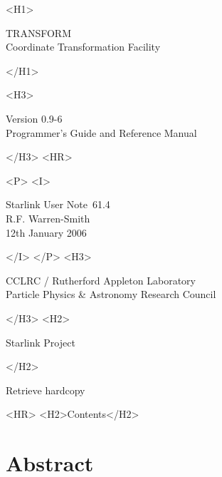 \documentclass[twoside,11pt]{article}
\newcommand{\stardoccategory}  {Starlink User Note}
\newcommand{\stardocsource}    {sun\stardocnumber}
\newcommand{\stardocnumber}    {61.4}
\newcommand{\stardocauthors}   {R.F. Warren-Smith}
\newcommand{\stardocdate}      {12th January 2006}
\newcommand{\stardoctitle}     {TRANSFORM \latexhtml{\\[2.5ex]}{\\}
                                Coordinate Transformation Facility}
\newcommand{\stardocversion}   {Version 0.9-6}
\newcommand{\stardocmanual}    {Programmer's Guide and Reference Manual}
\newcommand{\htmladdnormallink}[2]{#1}
\newcommand{\htmladdimg}[1]{}
\newcommand{\htmlref}[2]{#1}
\newcommand{\htmladdtonavigation}[1]{}
\newcommand{\latexhtml}[2]{#1}
\newcommand{\xlabel}[1]{}
\renewcommand{\_}{\texttt{\symbol{95}}}
\begin{document}
\begin{htmlonly}
   \xlabel{}
   \begin{rawhtml} <H1> \end{rawhtml}
      \stardoctitle
   \begin{rawhtml} </H1> \end{rawhtml}
   \begin{rawhtml} <H3> \end{rawhtml}
      \stardocversion \\
      \stardocmanual
   \begin{rawhtml} </H3> <HR> \end{rawhtml}


   \begin{rawhtml} <P> <I> \end{rawhtml}
   \stardoccategory\ \stardocnumber \\
   \stardocauthors \\
   \stardocdate
   \begin{rawhtml} </I> </P> <H3> \end{rawhtml}
      \htmladdnormallink{CCLRC / Rutherford Appleton Laboratory}
                        {http://www.cclrc.ac.uk} \\
      \htmladdnormallink{Particle Physics \& Astronomy Research Council}
                        {http://www.pparc.ac.uk} \\
   \begin{rawhtml} </H3> <H2> \end{rawhtml}
      \htmladdnormallink{Starlink Project}{http://www.starlink.ac.uk/}
   \begin{rawhtml} </H2> \end{rawhtml}
   \htmladdnormallink{\htmladdimg{source.gif} Retrieve hardcopy}
      {http://www.starlink.ac.uk/cgi-bin/hcserver?\stardocsource}\\

  \label{stardoccontents}
  \begin{rawhtml}
    <HR>
    <H2>Contents</H2>
  \end{rawhtml}
  \htmladdtonavigation{\htmlref{\htmladdimg{contents_motif.gif}}
        {stardoccontents}}

  \section{\xlabel{abstract}Abstract}
\end{htmlonly}
\end{document}
